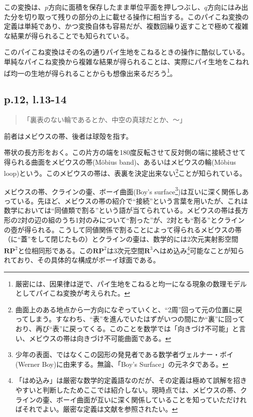 \documentclass[10pt, a5paper, twoside]{jsarticle}
\theoremstyle{definition}
\begin{document}
		この変換は、$p$方向に面積を保存したまま単位平面を押しつぶし、$q$方向にはみ出た分を切り取って残りの部分の上に載せる操作に相当する\cite{pie}。このパイこね変換の定義は単純であり、かつ変換自体も容易だが、複数回繰り返すことで極めて複雑な結果が得られることでも知られている\cite{yama}。

		このパイこね変換はその名の通りパイ生地をこねるときの操作に酷似している。単純なパイこね変換から複雑な結果が得られることは、実際にパイ生地をこねれば均一の生地が得られることからも想像出来るだろう\footnote{厳密には、因果律は逆で、パイ生地をこねると均一になる現象の数理モデルとしてパイこね変換が考えられた。}。

		\subsection{p.12, l.13-14}

		\begin{quote}
			
			「裏表のない輪であるとか、中空の真球だとか、〜」

		\end{quote}

		前者はメビウスの帯、後者は球殻を指す。

		帯状の長方形をおく。この片方の端を180度反転させて反対側の端に接続させて得られる曲面をメビウスの帯(Möbius band)、あるいはメビウスの輪(Möbius loop)という。このメビウスの帯は、表裏を決定出来ない\footnote{曲面上のある地点から一方向になぞっていくと、“2周”回って元の位置に戻ってしまう。すなわち、“表”を進んでいたはずがいつの間にか“裏”に回っており、再び“表”に戻ってくる。このことを数学では「向きづけ不可能」と言い、メビウスの帯は向きづけ不可能曲面である。}ことが知られている。

		メビウスの帯、クラインの壷、ボーイ曲面(Boy's surface\footnote{少年の表面、ではなくこの図形の発見者である数学者ヴェルナー・ボイ(Werner Boy)に由来する。無論、「Boy's Surface」の元ネタである。})は互いに深く関係しあっている。先ほど、メビウスの帯の紹介で“接続”という言葉を用いたが、これは数学においては“同値類で割る”という語が当てられている。メビウスの帯は長方形の2対の辺の組のうち1対のみについて“割った”が、2対とも“割る”とクラインの壺が得られる。こうして同値関係で割ることによって得られるメビウスの帯（に“蓋”をして閉じたもの）とクラインの壷は、数学的には2次元実射影空間$\bm{RP}^2$と位相同形である。この$\bm{RP}^2$は3次元空間$\bm{R}^3$へはめ込み\footnote{「はめ込み」は厳密な数学的定義語なのだが、その定義は極めて誤解を招きやすいと判断したためここでは紹介しない。現時点では、メビウスの帯、クラインの壷、ボーイ曲面が互いに深く関係していることを知っていただければそれでよい。厳密な定義は文献\cite{mat}を参照されたい。}可能なことが知られており、その具体的な構成がボーイ球面である。
\end{document}
